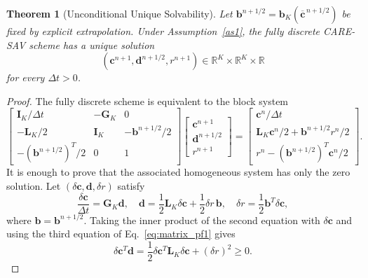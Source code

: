 \documentclass[10pt,a4paper]{amsart}
\newtheorem{theorem}{Theorem}
\begin{document}
\begin{theorem}[Unconditional Unique Solvability]
\label{thm:uus}
  Let $\boldsymbol b^{n+1/2}=\boldsymbol b_K(\overline{\boldsymbol c}^{\,n+1/2})$ be fixed by explicit extrapolation. Under Assumption~\ref{as1}, the fully discrete CARE-SAV scheme has a unique solution
  $$
    (\boldsymbol c^{n+1},\boldsymbol d^{n+1/2},r^{n+1}) \in\mathbb R^K\times\mathbb R^K\times\mathbb R
  $$
  for every $\Delta t>0$.
\end{theorem}

\begin{proof}
  The fully discrete scheme is equivalent to the block system
  \begin{equation}
    \label{eq:square_system_pf1}
    \begin{bmatrix}
  \boldsymbol{I}_K/\Delta t&-\boldsymbol{G}_K&0\\
  -\boldsymbol{L}_K/2&\boldsymbol{I}_K&-\boldsymbol b^{n+1/2}/2\\
  -(\boldsymbol b^{n+1/2})^{T}/2&0&1
  \end{bmatrix}
  \begin{bmatrix}
  \boldsymbol c^{n+1}\\
  \boldsymbol d^{n+1/2}\\
  r^{n+1}
  \end{bmatrix}
  =
  \begin{bmatrix}
  \boldsymbol c^n/\Delta t\\
  \boldsymbol{L}_K\boldsymbol c^n/2+\boldsymbol b^{n+1/2}r^n/2\\
  r^n-(\boldsymbol b^{n+1/2})^{T}\boldsymbol c^n/2
  \end{bmatrix}.
  \end{equation}
  It is enough to prove that the associated homogeneous system has only the zero solution. Let $(\delta\boldsymbol c,\boldsymbol d,\delta r)$ satisfy
  \begin{equation}
  \label{eq:matrix_pf1}
    \frac{\delta\boldsymbol c}{\Delta t}=\boldsymbol{G}_K\boldsymbol d,
    \quad
    \boldsymbol d=\frac12\boldsymbol{L}_K\delta\boldsymbol c +\frac12\delta r\,\boldsymbol b,
    \quad
    \delta r=\frac12\boldsymbol b^{T}\delta\boldsymbol c,
  \end{equation}
  where $\boldsymbol b=\boldsymbol b^{n+1/2}$. Taking the inner product of the second equation with $\delta\boldsymbol c$ and using the third equation of Eq.~\eqref{eq:matrix_pf1} gives
  \begin{equation}
  \label{eq:uus_pf1}
    \delta\boldsymbol c^{T}\boldsymbol d =\frac12\delta\boldsymbol c^{T}\boldsymbol{L}_K\delta\boldsymbol c +(\delta r)^2 \ge 0.

\end{equation}
\end{proof}
\end{document}
